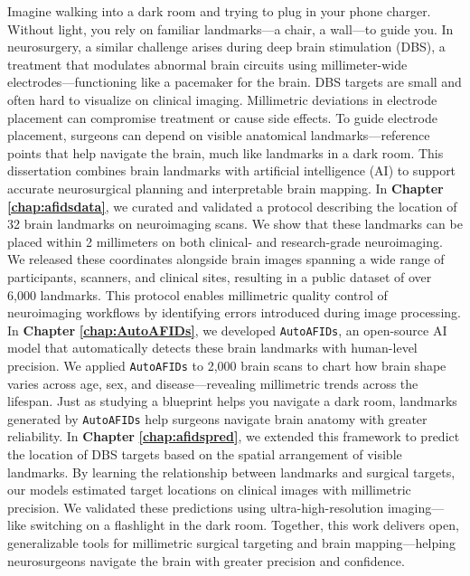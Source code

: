 \onehalfspacing
Imagine walking into a dark room and trying to plug in your phone charger. Without light, you rely on familiar landmarks—a chair, a wall—to guide you. In neurosurgery, a similar challenge arises during deep brain stimulation (DBS), a treatment that modulates abnormal brain circuits using millimeter-wide electrodes—functioning like a pacemaker for the brain. DBS targets are small and often hard to visualize on clinical imaging. Millimetric deviations in electrode placement can compromise treatment or cause side effects. To guide electrode placement, surgeons can depend on visible anatomical landmarks—reference points that help navigate the brain, much like landmarks in a dark room. This dissertation combines brain landmarks with artificial intelligence (AI) to support accurate neurosurgical planning and interpretable brain mapping. In \textbf{Chapter} \textbf{\ref{chap:afidsdata}}, we curated and validated a protocol describing the location of 32 brain landmarks on neuroimaging scans. We show that these landmarks can be placed within 2 millimeters on both clinical- and research-grade neuroimaging. We released these coordinates alongside brain images spanning a wide range of participants, scanners, and clinical sites, resulting in a public dataset of over 6,000 landmarks. This protocol enables millimetric quality control of neuroimaging workflows by identifying errors introduced during image processing. In \textbf{Chapter} \textbf{\ref{chap:AutoAFIDs}}, we developed \texttt{AutoAFIDs}, an open-source AI model that automatically detects these brain landmarks with human-level precision. We applied \texttt{AutoAFIDs} to 2,000 brain scans to chart how brain shape varies across age, sex, and disease—revealing millimetric trends across the lifespan. Just as studying a blueprint helps you navigate a dark room, landmarks generated by \texttt{AutoAFIDs} help surgeons navigate brain anatomy with greater reliability. In \textbf{Chapter} \textbf{\ref{chap:afidspred}}, we extended this framework to predict the location of DBS targets based on the spatial arrangement of visible landmarks. By learning the relationship between landmarks and surgical targets, our models estimated target locations on clinical images with millimetric precision. We validated these predictions using ultra-high-resolution imaging—like switching on a flashlight in the dark room. Together, this work delivers open, generalizable tools for millimetric surgical targeting and brain mapping—helping neurosurgeons navigate the brain with greater precision and confidence.
